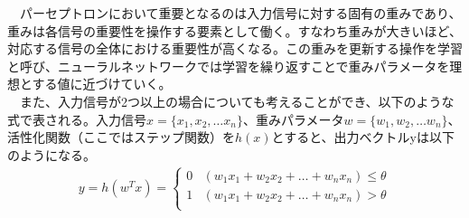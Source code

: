 　パーセプトロンにおいて重要となるのは入力信号に対する固有の重みであり、重みは各信号の重要性を操作する要素として働く。すなわち重みが大きいほど、対応する信号の全体における重要性が高くなる。この重みを更新する操作を学習と呼び、ニューラルネットワークでは学習を繰り返すことで重みパラメータを理想とする値に近づけていく。\\
　また、入力信号が2つ以上の場合についても考えることができ、以下のような式で表される。入力信号$x = \{ x_1, x_2, \ldots x_n \}$、重みパラメータ$w = \{ w_1, w_2, \ldots w_n \}$、活性化関数（ここではステップ関数）を$h(x)$とすると、出力ベクトルyは以下のようになる。
\begin{align}
y = h(w^T x) =
 \begin{cases}
 0 & (w_1x_1 + w_2x_2 + \ldots + w_nx_n) \leq \theta\\
 1 & (w_1x_1 + w_2x_2 + \ldots + w_nx_n) > \theta \\
 \end{cases}
\end{align}
